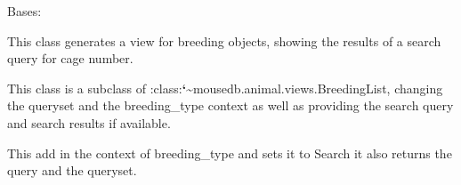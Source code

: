 \documentclass[letterpaper,10pt,english]{sphinxmanual}
\begin{document}
\begin{fulllineitems}
\label{api:mousedb.animal.views.BreedingSearch}
Bases: {\hyperref[api:mousedb.animal.views.BreedingList]{}}

This class generates a view for breeding objects, showing the results of a search query for cage number.

This class is a subclass of :class:{\color{red}\bfseries{}{}`}\textasciitilde{}mousedb.animal.views.BreedingList, changing the queryset and the  breeding\_type context as well as providing the search query and search results if available.

\begin{fulllineitems}
\label{api:mousedb.animal.views.BreedingSearch.get_context_data}
This add in the context of breeding\_type and sets it to Search it also returns the query and the queryset.

\end{fulllineitems}


\begin{fulllineitems}
\label{api:mousedb.animal.views.BreedingSearch.template_name}
\end{fulllineitems}


\end{fulllineitems}

\end{document}

